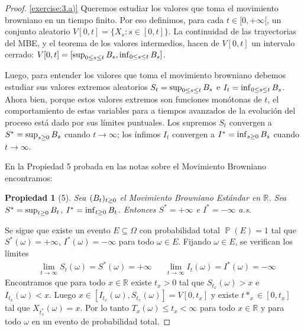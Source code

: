 \documentclass{article}
\DeclareMathOperator{\prob}{\mathbb{P}}
\newcommand{\realnum}{\mathbb{R}}
\newtheorem{property}{Propiedad}
\theoremstyle{definition}
\begin{document}
\begin{proof} \ref{exercise:3.a)}
Queremos estudiar los valores que toma el movimiento browniano en un tiempo finito.
Por eso definimos, para cada \(t \in [0 , + \infty[\), un conjunto aleatorio \(V [0, t] = \{X_s : s \in [0, t]\}\).
La continuidad de las trayectorias del MBE, y el teorema de los valores intermedios, hacen de \(V [0, t]\) un intervalo cerrado: \(V [0, t] = [\sup_{0 \leq s \leq t} B_s, \inf_{0 \leq s \leq t} B_s]\).

Luego, para entender los valores que toma el movimiento browniano debemos estudiar sus valores extremos aleatorios \(S_t = \sup_{0 \leq s \leq t} B_s\) e \(I_t = \inf_{0 \leq s \leq t} B_s\).
Ahora bien, porque estos valores extremos son funciones monótonas de \(t\), el comportamiento de estas variables para a tiempos avanzados de la evolución del proceso está dado por sus límites puntuales.
Los supremos \(S_t\) convergen a \(S^* = \sup_{s \geq 0} B_s\) cuando \(t \rightarrow \infty\); los ínfimos \(I_t\) convergen a \(I^* = \inf_{s \geq 0} B_s\) cuando \(t \rightarrow \infty\).

En la Propiedad 5 probada en las notas sobre el Movimiento Browniano encontramos:
\begin{property}[5]
Sea \((B_t)_{t \geq 0}\) el Movimiento Browniano Estándar en \(\realnum\).
Sea \(S^* = \sup_{t \geq 0} B_t\), \(I^* = \inf_{t \geq 0} B_t\).
Entonces \(S^* = + \infty\) e \(I^* = - \infty\) a.s.
\end{property}
Se sigue que existe un evento \(E \subseteq \Omega\) con probabilidad total \(\prob(E) = 1\) tal que \(S^*(\omega) = + \infty\), \(I^*(\omega) = - \infty\) para todo \(\omega \in E\).
Fijando \(\omega \in E\), se verifican los límites 
\begin{align}
	&\lim_{t \rightarrow \infty} S_t(\omega) 
		= S^*(\omega) 
		= + \infty
	&
	&\lim_{t \rightarrow \infty} I_t(\omega) 
		= I^*(\omega) 
		= - \infty
\end{align}
Encontramos que para todo \(x \in \realnum\) existe \(t_x > 0\) tal que \(S_{t_x}(\omega) > x\) e \(I_{t_x}(\omega) < x\).
Luego \(x \in [I_{t_x}(\omega), S_{t_x}(\omega)] = V [0, t_x]\) y existe \(t*_x \in [0, t_x]\) tal que \(X_{t^*_x}(\omega) = x\).
Por lo tanto \(T_x(\omega) \leq t_x < \infty\) para todo \(x \in \realnum\) y para todo \(\omega\) en un evento de probabilidad total.
\end{proof}
\end{document}

